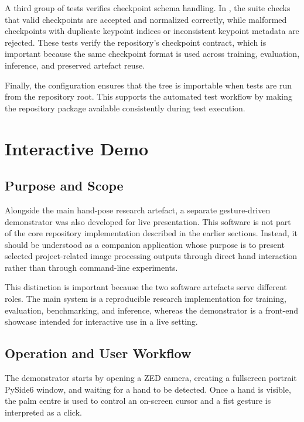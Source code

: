 ﻿\documentclass[11pt,a4paper]{article}
\begin{document}
\medskip

A third group of tests verifies checkpoint schema handling. In
, the suite checks that valid checkpoints
are accepted and normalized correctly, while malformed checkpoints with
duplicate keypoint indices or inconsistent keypoint metadata are rejected.
These tests verify the repository's checkpoint contract, which is important
because the same checkpoint format is used across training, evaluation,
inference, and preserved artefact reuse.

\medskip

Finally, the  configuration ensures that the
 tree is importable when tests are run from the repository root.
This supports the automated test workflow by making the repository package
available consistently during test execution.

\medskip

\section{Interactive Demo}

\subsection{Purpose and Scope}

Alongside the main hand-pose research artefact, a separate gesture-driven
demonstrator was also developed for live presentation. This software is not
part of the core  repository implementation described in
the earlier sections. Instead, it should be understood as a companion
application whose purpose is to present selected project-related image
processing outputs through direct hand interaction rather than through
command-line experiments.

\medskip

This distinction is important because the two software artefacts serve
different roles. The main system is a reproducible research implementation for
training, evaluation, benchmarking, and inference, whereas the demonstrator is
a front-end showcase intended for interactive use in a live setting.

\subsection{Operation and User Workflow}

The demonstrator starts by opening a ZED camera, creating a fullscreen portrait
PySide6 window, and waiting for a hand to be detected. Once a hand is visible,
the palm centre is used to control an on-screen cursor and a fist gesture is
interpreted as a click.
\end{document}
